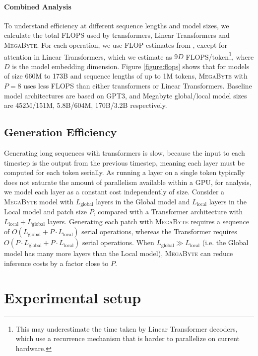\documentclass{article}
\newcommand{\fastslow}[0]{\textsc{MegaByte}\xspace}
\newcommand{\megabyte}[0]{\fastslow}
\newcommand{\Lglobal}[0]{L_{\text{global}}}
\newcommand{\Llocal}[0]{L_{\text{local}}}
\theoremstyle{plain}
\theoremstyle{definition}
\theoremstyle{remark}
\begin{document}
\paragraph{Combined Analysis} To understand efficiency at different sequence lengths and model sizes, we calculate the total FLOPS used by transformers, Linear Transformers and \megabyte. For each operation, we use FLOP estimates from \citep{kaplan2020scaling}, except for attention in Linear Transformers, which we estimate as $9D$ FLOPS/token\footnote{This may underestimate the time taken by Linear Transformer decoders, which use a recurrence mechanism that is harder to parallelize on current hardware.}, where $D$ is the model embedding dimension. Figure \ref{figure:flops} shows that for models of size 660M to 173B and sequence lengths of up to 1M tokens, \megabyte with $P=8$ uses less FLOPS than either transformers or Linear Transformers. Baseline model architectures are based on GPT3, and Megabyte global/local model sizes are 452M/151M, 5.8B/604M, 170B/3.2B respectively.

\subsection{Generation Efficiency}
Generating long sequences with transformers is slow, because the input to each timestep is the output from the previous timestep, meaning each layer must be computed for each token serially. As running a layer on a single token typically does not saturate the amount of parallelism available within a GPU, for analysis, we model each layer as a constant cost independently of size. Consider a \megabyte model with $\Lglobal$ layers in the Global model and $\Llocal$ layers in the Local model and patch size $P$, compared with a Transformer architecture with $\Llocal+\Lglobal$ layers. Generating each patch with \megabyte requires a sequence of $O(\Lglobal+P\cdot \Llocal)$ serial operations, whereas the Transformer requires $O(P\cdot \Lglobal+P\cdot \Llocal)$ serial operations. When $\Lglobal\gg \Llocal$ (i.e. the Global model has many more layers than the Local model), \megabyte can reduce inference costs by a factor close to $P$.

\section{Experimental setup}
\label{sec:exp}
\end{document}
